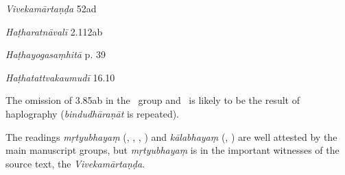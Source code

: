 \begin{ekdosis}
\begin{sources}[hp03_085]
\emph{Vivekamārtaṇḍa} 52ad
\begin{versinnote}
\end{versinnote}
\end{sources}

\begin{testimonia}[hp03_085]
\emph{Haṭharatnāvalī} 2.112ab
\begin{versinnote}
\end{versinnote}

\emph{Haṭhayogasaṃhitā} p. 39
\begin{versinnote}
\end{versinnote}

\emph{Haṭhatattvakaumudī} 16.10
\begin{versinnote}
\end{versinnote}
\end{testimonia}

\begin{philcomm}[hp03_085]
The omission of 3.85ab in the \texteta\ group and \deltaThree\ is likely to be the result of haplography (\emph{bindudhāraṇāt} is repeated).\lb


The readings \emph{mṛtyubhayaṃ} (\alphaThree, \textbeta, \textepsilon, \texteta) and \emph{kālabhayaṃ} (\alphaTwo, \textgamma) are well attested by the main manuscript groups, but \emph{mṛtyubhayaṃ} is in the important witnesses of the source text, the \emph{Vivekamārtaṇḍa}.
\end{philcomm}


\end{ekdosis}
